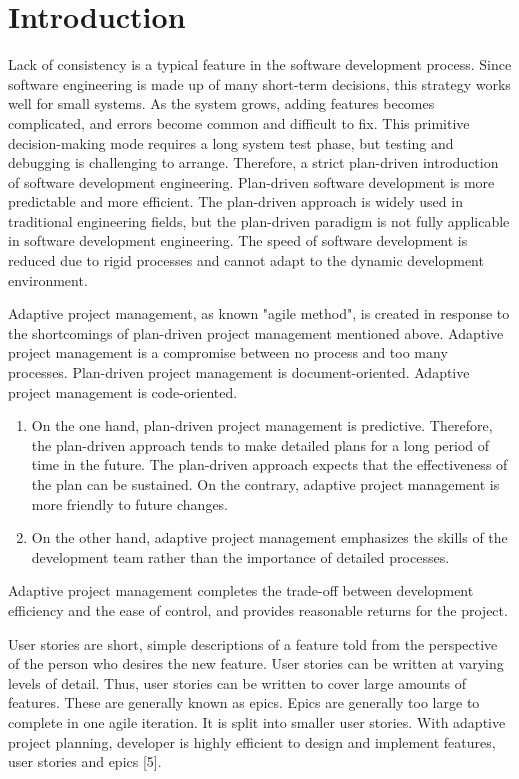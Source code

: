 \documentclass{sigchi}
\begin{document}
\section{Introduction}
Lack of consistency is a typical feature in the software development process. Since software engineering is made up of many short-term decisions, this strategy works well for small systems. As the system grows, adding features becomes complicated, and errors become common and difficult to fix. This primitive decision-making mode requires a long system test phase, but testing and debugging is challenging to arrange. Therefore, a strict plan-driven introduction of software development engineering. Plan-driven software development is more predictable and more efficient. The plan-driven approach is widely used in traditional engineering fields, but the plan-driven paradigm is not fully applicable in software development engineering. The speed of software development is reduced due to rigid processes and cannot adapt to the dynamic development environment. 

Adaptive project management, as known "agile method", is created in response to the shortcomings of plan-driven project management mentioned above. Adaptive project management is a compromise between no process and too many processes. Plan-driven project management is document-oriented. Adaptive project management is code-oriented.
\begin{enumerate}
\item On the one hand, plan-driven project management is predictive. Therefore, the plan-driven approach tends to make detailed plans for a long period of time in the future. The plan-driven approach expects that the effectiveness of the plan can be sustained. On the contrary, adaptive project management is more friendly to future changes.
\item On the other hand, adaptive project management emphasizes the skills of the development team rather than the importance of detailed processes.
\end{enumerate}

Adaptive project management completes the trade-off between development efficiency and the ease of control, and provides reasonable returns for the project.

User stories are short, simple descriptions of a feature told from the perspective of the person who desires the new feature. User stories can be written at varying levels of detail. Thus, user stories can be written to cover large amounts of features. These are generally known as epics. Epics are generally too large to complete in one agile iteration. It is split into smaller user stories. With adaptive project planning, developer is highly efficient to design and implement features, user stories and epics [5].
\end{document}
